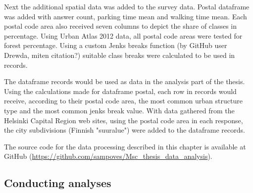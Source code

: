 Next the additional spatial data was added to the survey data. Postal dataframe was added with answer count, parking time mean and walking time mean. Each postal code area also received seven columns to depict the share of classes in percentage. Using Urban Atlas 2012 data, all postal code areas were tested for forest percentage. Using a custom Jenks breaks function (by GitHub user Drewda, miten citation?) suitable class breaks were calculated to be used in records.

The dataframe records would be used as data in the analysis part of the thesis. Using the calculations made for dataframe postal, each row in records would receive, according to their postal code area, the most common urban structure type and the most common jenks break value. With data gathered from the Helsinki Capital Region web sites, using the postal code area in each response, the city subdivisions (Finnish "suuralue") were added to the dataframe records.

The source code for the data processing described in this chapter is available at GitHub (\textcolor{blue}{\url{https://github.com/sampoves/Msc_thesis_data_analysis}}).

\subsection{Conducting analyses}

